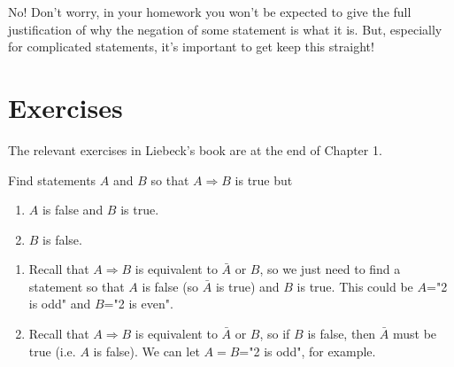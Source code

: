 \documentclass[11pt,dvipsnames]{book}
\numberwithin{figure}{section} %
\numberwithin{table}{section} %
\begin{document}
 No! Don't worry, in your homework you won't be expected to give the full justification of why the negation of some statement is what it is. But, especially for complicated statements, it's important to get keep this straight!

\section{Exercises}

The relevant exercises in Liebeck's book are at the end of Chapter 1.

\begin{exercise}
Find statements $A$ and $B$ so that $A\Rightarrow B$ is true but
\begin{enumerate}[label=(\alph*)]
\item $A$ is false and $B$ is true.
\item $B$ is false.
\end{enumerate}
\begin{solution}
\begin{enumerate}[label=(\alph*)]
\item
Recall that $A\Rightarrow B$ is equivalent to $\bar{A}$ or $B$, so we just need to find a statement so that $A$ is false (so $\bar{A}$ is true) and $B$ is true. This could be $A$="2 is odd" and $B$="2 is even".
\item Recall that $A\Rightarrow B$ is equivalent to $\bar{A}$ or $B$, so if $B$ is false, then $\bar{A}$ must be true (i.e. $A$ is false). We  can  let $A=B$="2 is odd", for example.
\end{enumerate}
\end{solution}
\end{exercise}
\end{document}
